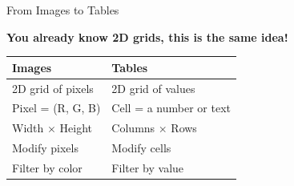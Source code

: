 \documentclass{csbeamer}
\begin{document}
\begin{frame}{From Images to Tables}
    \begin{center}
        \textbf{You already know 2D grids, this is the same idea!}
    \end{center}

    \vspace{0.5em}

    \begin{center}
        \begin{tabular}{l|l}
            \textbf{\textcolor{stfxblue}{Images}} & \textbf{\textcolor{marigold}{Tables}} \\
            \hline
            2D grid of \textcolor{stfxblue}{pixels}    & 2D grid of \textcolor{marigold}{values} \\
            Pixel = (R, G, B)                           & Cell = a number or text \\
            Width $\times$ Height                       & Columns $\times$ Rows \\
            Modify pixels                               & Modify cells \\
            Filter by color                             & Filter by value \\
        \end{tabular}
    \end{center}

    \vspace{1em}

    \begin{center}
    \end{center}

    \vspace{0.5em}

\end{frame}
\end{document}
